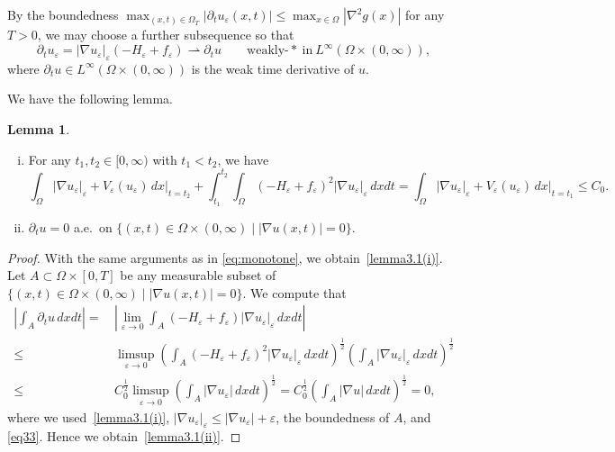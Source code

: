 \documentclass{amsart}
\theoremstyle{definition}
\newtheorem{lemma}[definition]{Lemma}
\begin{document}
By the boundedness 
$\max _{(x,t) \in \Omega_T } 
| \partial_t u_\varepsilon (x,t)|
\leq
\max_{x \in \Omega } |\nabla ^2 g (x)|$ for any $T>0$,
we may choose a further subsequence so that
\begin{equation}\label{eq:37}
\partial_t u_\varepsilon 
=|\nabla u_\varepsilon|_\varepsilon ( -H_\varepsilon + f_\varepsilon)
\rightharpoonup \partial _t u
\qquad 
\text{weakly-}\ast \ \text{in} \ L^\infty (\Omega \times (0,\infty)),
\end{equation}
where $\partial_t u \in L^\infty (\Omega \times (0,\infty))$ is the weak time derivative of $u$.

We have the following lemma.

\begin{lemma}\label{lemma3.1}
\begin{enumerate}[(i)]
\item \label{lemma3.1(i)} For any $t_1,t_2 \in [0,\infty)$ with $t_1<t_2$, we have
\begin{equation}\label{eq:38}
\int_{\Omega}
|\nabla u_\varepsilon|_\varepsilon + V_\varepsilon (u_\varepsilon) \, dx\Big|_{t=t_2}
+
\int_{t_1} ^{t_2} \int_\Omega ( -H_\varepsilon + f_\varepsilon)^2 |\nabla u_\varepsilon|_\varepsilon 
\, dx dt
=
\int_{\Omega}
|\nabla u_\varepsilon|_\varepsilon + V_\varepsilon (u_\varepsilon) \, dx\Big|_{t=t_1}
\leq C_0. 
\end{equation}
\item\label{lemma3.1(ii)} $\partial_t u =0$ a.e.\ on $\{ (x,t) \in \Omega \times (0,\infty) \mid  |\nabla u (x,t)|=0 \}$.
\end{enumerate}
\end{lemma} 
\begin{proof}
With the same arguments as in \eqref{eq:monotone}, we obtain~\eqref{lemma3.1(i)}. 
Let $A \subset \Omega \times [0,T]$ be any measurable subset of 
$\{ (x,t) \in \Omega \times (0,\infty) \mid  |\nabla u (x,t)|=0 \}$.
We compute that
\begin{equation}\label{eq:39}
\begin{split}
\left| \int_{A} \partial _t u \, dxdt \right|
= & \, 
\left| \lim_{\varepsilon \to 0} \int_{A} ( -H_\varepsilon + f_\varepsilon) |\nabla u_\varepsilon|_\varepsilon \, dxdt \right| \\
\leq & \, \limsup_{\varepsilon \to 0} 
\left( \int_A ( -H_\varepsilon + f_\varepsilon)^2 |\nabla u_\varepsilon|_\varepsilon 
\, dx dt \right)^{\frac12}
\left( \int_A  |\nabla u_\varepsilon|_\varepsilon 
\, dx dt \right)^{\frac12} \\
\leq & \, 
C_0 ^{\frac12} \limsup _{\varepsilon \to 0} \left( \int_A  |\nabla u_\varepsilon| 
\, dx dt \right)^{\frac12} 
=
C_0 ^{\frac12} \left( \int_A  |\nabla u| 
\, dx dt \right)^{\frac12} =0,
\end{split}
\end{equation}
where we used~\eqref{lemma3.1(i)}, $|\nabla u_\varepsilon|_\varepsilon \leq |\nabla u_\varepsilon| +\varepsilon$, the boundedness of $A$, and \eqref{eq33}.
Hence we obtain~\eqref{lemma3.1(ii)}.
\end{proof}
\end{document}
